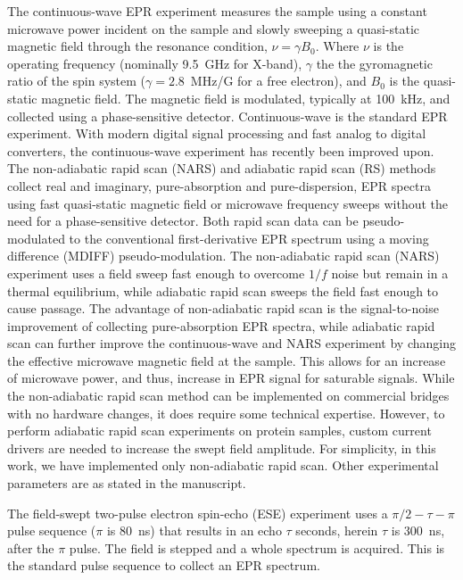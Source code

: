 The continuous-wave EPR experiment measures the sample using a constant microwave power incident on the sample and slowly sweeping a quasi-static magnetic field through the resonance condition, $\nu =\gamma B_0$. Where $\nu$ is the operating frequency (nominally 9.5~GHz for X-band), $\gamma$ the the gyromagnetic ratio of the spin system ($\gamma = 2.8$~MHz/G for a free electron), and $B_0$ is the quasi-static magnetic field. The magnetic field is modulated, typically at 100~kHz, and collected using a phase-sensitive detector. \cite{weil2007electron} Continuous-wave is the standard EPR experiment. With modern digital signal processing and fast analog to digital converters, the continuous-wave experiment has recently been improved upon. The non-adiabatic rapid scan (NARS) \cite{KITTELL2011228, KITTELL201251, KITTELL201568, Hyde2013MDIFF, YU201558} and adiabatic rapid scan (RS) \cite{JOSHI200544,TSEITLIN200948, MITCHELL2012221, RScompare,MOSER2017} methods collect real and imaginary, pure-absorption and pure-dispersion, EPR spectra using fast quasi-static magnetic field or microwave frequency sweeps without the need for a phase-sensitive detector. Both rapid scan data can be pseudo-modulated to the conventional first-derivative EPR spectrum using a moving difference (MDIFF) pseudo-modulation. \cite{Hyde2013MDIFF} The non-adiabatic rapid scan (NARS) experiment uses a field sweep fast enough to overcome $1/f$ noise but remain in a thermal equilibrium, while adiabatic rapid scan sweeps the field fast enough to cause passage. The advantage of non-adiabatic rapid scan is the signal-to-noise improvement of collecting pure-absorption EPR spectra, while adiabatic rapid scan can further improve the continuous-wave and NARS experiment by changing the effective microwave magnetic field at the sample. This allows for an increase of microwave power, and thus, increase in EPR signal for saturable signals. \cite{JOSHI200544} While the non-adiabatic rapid scan method can be implemented on commercial bridges with no hardware changes, it does require some technical expertise. \cite{MOSER2017} However, to perform adiabatic rapid scan experiments on protein samples, custom current drivers are needed to increase the swept field amplitude. For simplicity, in this work, we have implemented only non-adiabatic rapid scan. Other experimental parameters are as stated in the manuscript.

The field-swept two-pulse electron spin-echo (ESE) experiment uses a ${\pi/2\!-\!\tau\!-\!\pi}$ pulse sequence ($\pi$ is 80~ns) that results in an echo $\tau$ seconds, herein $\tau$ is 300~ns, after the $\pi$ pulse. The field is stepped and a whole spectrum is acquired. This is the standard pulse sequence to collect an EPR spectrum. \cite{schweiger2001principles} 

